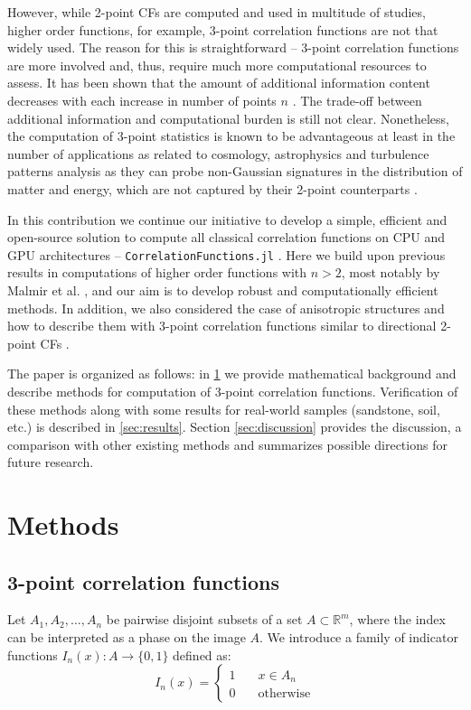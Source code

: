 \documentclass[reprint,amsmath,amssymb,aps,pre,showkeys,showpacs]{revtex4-1}
\newcommand{\code}[1]{\colorbox{light-gray}{\texttt{#1}}}
\begin{document}
However, while 2-point CFs are computed and used in multitude of studies, higher
order functions, for example, 3-point correlation functions are not that widely
used. The reason for this is straightforward -- 3-point correlation functions
are more involved and, thus, require much more computational resources to
assess. It has been shown that the amount of additional information content
decreases with each increase in number of points $n$
\cite{yao1993high,Gommes2}. The trade-off between additional information and
computational burden is still not clear. Nonetheless, the computation of 3-point
statistics is known to be advantageous at least in the number of applications as
related to cosmology, astrophysics and turbulence patterns analysis as they can
probe non-Gaussian signatures in the distribution of matter and energy, which
are not captured by their 2-point counterparts
\cite{TakadaJain,hopkins2013stars,gorbunova2016precessing,yoo2022non}.

In this contribution we continue our initiative to develop a simple, efficient
and open-source solution to compute all classical correlation functions on CPU
and GPU architectures -- \code{CorrelationFunctions.jl} \cite{CFsjlpaper}. Here
we build upon previous results in computations of higher order functions with
$n > 2$, most notably by Malmir et al. \cite{malmir2018}, and our aim is to
develop robust and computationally efficient methods. In addition, we also
considered the case of anisotropic structures and how to describe them with
3-point correlation functions similar to directional 2-point CFs
\cite{10.1063/1.4867611,EPL1}.

The paper is organized as follows: in \cref{sec:methods} we provide
mathematical background and describe methods for computation of 3-point
correlation functions. Verification of these methods along with some results for
real-world samples (sandstone, soil, etc.) is described in
\cref{sec:results}. Section \ref{sec:discussion} provides the discussion, a
comparison with other existing methods and summarizes possible directions for
future research.

\section{Methods}
\label{sec:methods}
\subsection{3-point correlation functions}
Let $A_1, A_2, \dots, A_n$ be pairwise disjoint subsets of a set
$A \subset \mathbb{R}^m$, where the index can be interpreted as a phase on the
image $A$. We introduce a family of indicator functions
$I_n(x) : A \rightarrow \{0,1\}$ defined as:
\begin{equation}
  I_n(x) = \left\{
  \begin{array}{ll}
    1 & \quad x \in A_n \\
    0 & \quad \text{otherwise}
  \end{array}
  \right.
\end{equation}
\end{document}
